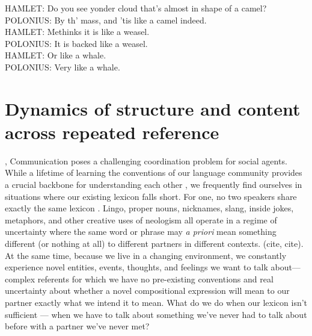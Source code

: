 \begin{savequote}[75mm]
HAMLET: Do you see yonder cloud that’s almost in shape of a camel?\\
POLONIUS: By th' mass, and ’tis like a camel indeed.\\
HAMLET: Methinks it is like a weasel.\\
POLONIUS: It is backed like a weasel.\\
HAMLET: Or like a whale.\\
POLONIUS: Very like a whale.\\
\end{savequote}


\chapter{Dynamics of structure and content across repeated reference}
\graphicspath{{./figures/tangrams/}}

, Communication poses a challenging coordination problem for social agents. 
While a lifetime of learning the conventions of our language community provides a crucial backbone for understanding each other \cite{Lewis69_Convention}, we frequently find ourselves in situations where our existing lexicon falls short.
For one, no two speakers share exactly the same lexicon \cite{Davidson86_DerangementOfEpitaphs, Clark98_CommunalLexicons}. 
Lingo, proper nouns, nicknames, slang, inside jokes, metaphors, and other creative uses of neologism all operate in a regime of uncertainty where the same word or phrase may \emph{a priori} mean something different (or nothing at all) to different partners in different contexts. (cite, cite).
At the same time, because we live in a changing environment, we constantly experience novel entities, events, thoughts, and feelings we want to talk about---complex referents for which we have no pre-existing conventions and real uncertainty about whether a novel compositional expression will mean to our partner exactly what we intend it to mean.
What do we do when our lexicon isn't sufficient --- when we have to talk about something we've never had to talk about before with a partner we've never met?

